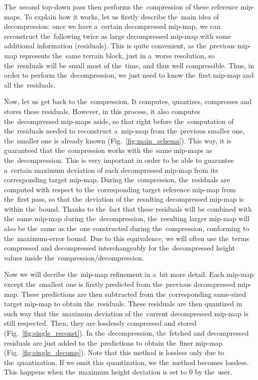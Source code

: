 The~second top-down pass then performs the~compression of these reference mip-maps. To explain how it works, let us firstly describe the~main idea of decompression: once we have a~certain decompressed mip-map, we can reconstruct the~following twice as large  decompressed mip-map with some additional information (residuals). This is quite convenient, as the~previous mip-map represents the~same terrain block, just in a~worse resolution, so the~residuals will be small most of the~time, and thus well compressible. Thus, in order to perform the~decompression, we just need to know the~first mip-map and all the~residuals. 

Now, let us get back to the~compression. It computes, quantizes, compresses and stores these residuals. However, in this process, it also computes the~decompressed mip-maps aside, so that right before the~computation of the~residuals needed to reconstruct a~mip-map from the~previous smaller one, the~smaller one is already known (Fig.~\ref{fig:main_schema}). This way, it is guaranteed that the~compression works with the~same mip-maps as the~decompression.  This is very important in order to be able to guarantee a~certain maximum deviation of each decompressed mip-map from its corresponding target mip-map. During the~compression, the~residuals are computed with respect to the~corresponding target reference mip-map from the~first pass, so that the~deviation of the~resulting decompressed mip-map is within the~bound. Thanks to the~fact that these residuals will be combined with the~same mip-map during the~decompression, the~resulting larger mip-map will also be the~same as the~one constructed during the~compression, conforming to the~maximum-error bound. Due to this equivalence, we will often use the~terms compressed and decompressed interchangeably for the~decompressed height values inside the~compression/decompression.

Now we will decribe the~mip-map refinement in a~bit more detail. Each mip-map except the~smallest one is firstly predicted from the~previous decompressed mip-map. These predictions are then subtracted from the~corresponding same-sized target mip-map to obtain the~residuals. These residuals are then quantized in such way that the~maximum deviation of the~current decompressed mip-map is still respected. Then, they are losslessly compressed and stored (Fig.~\ref{fig:single_reconst}). In the~decompression, the~fetched and decompressed residuals are just added to the~predictions to obtain the~finer mip-map (Fig.~\ref{fig:single_decomp}). Note that this method is lossless only due to the~quantization. If we omit this quantization, we the~method becomes lossless. This happens when the~maximum height deviation is set to 0 by the~user.

